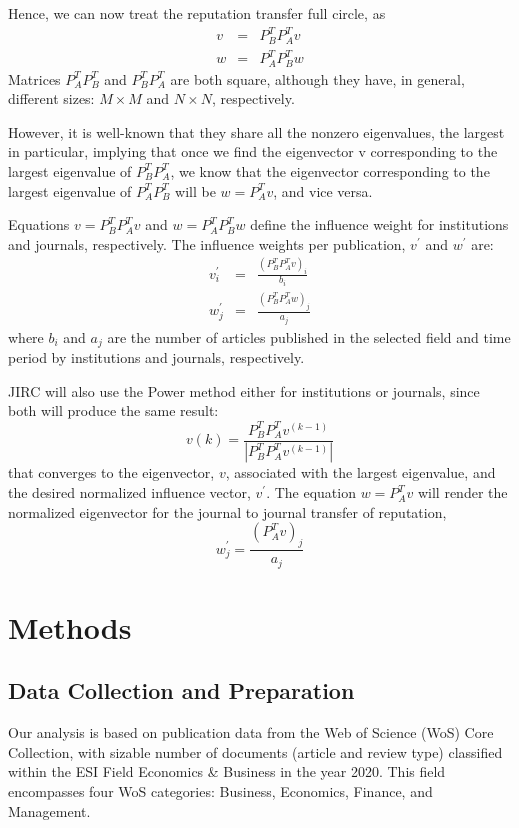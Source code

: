 \documentclass[10pt]{article}
\begin{document}
Hence, we can now treat the reputation transfer full circle, as
\begin{eqnarray}
 v & = & P_B^TP_A^Tv\\
 w & = & P_A^TP_B^Tw
 \end{eqnarray}
 Matrices $P_A^TP_B^T$ and $P_B^TP_A^T$ are both square, although they have, in general, different sizes: $M\times M$ and $N\times N$, respectively.

 However, it is well-known that they share all the nonzero eigenvalues, the largest in particular, implying that once we find the eigenvector v corresponding to the largest eigenvalue of $P_B^TP_A^T$, we know that the eigenvector corresponding to the largest eigenvalue of $P_A^TP_B^T$ will be $w=P_A^Tv$, and vice versa.

Equations $v=P_B^TP_A^Tv$ and $w=P_A^TP_B^Tw$ define the influence weight for institutions and journals, respectively. The influence weights per
publication, $v^{\prime}$ and $w^{\prime}$ are:
\begin{eqnarray*}
v^{\prime}_i &=& \frac{(P_B^TP_A^Tv)_i}{b_{i}} \\
w^{\prime}_j &=& \frac{(P_B^TP_A^Tw)_j}{a_{j}}
\end{eqnarray*}
where $b_i$ and $a_j$ are the number of articles published  in the selected field and time period by institutions and journals, respectively.


\noindent JIRC will also  use the Power method either for institutions or journals, since both will produce the same result:
\begin{equation}
v(k)=\frac{P_B^TP_A^Tv^{(k-1)}}{|P_B^TP_A^Tv^{(k-1)}|}
\label{pm}
\end{equation}
that converges to the eigenvector, $v$, associated with the largest eigenvalue,  and the desired normalized influence vector, $v^{\prime}$. The equation $w=P_A^Tv$ will render the normalized eigenvector for the journal to journal transfer of reputation,
\begin{equation}
w^{\prime}_j =
\frac{(P_A^Tv)_j}{a_{j}}
\end{equation}
\section{Methods}

\subsection{Data Collection and Preparation}
Our analysis is based on publication data from the Web of Science (WoS) Core Collection,  with sizable number of documents  (article and review type) classified within the ESI Field Economics \& Business in the year 2020. This field encompasses four WoS categories: Business, Economics, Finance, and Management.
\end{document}
